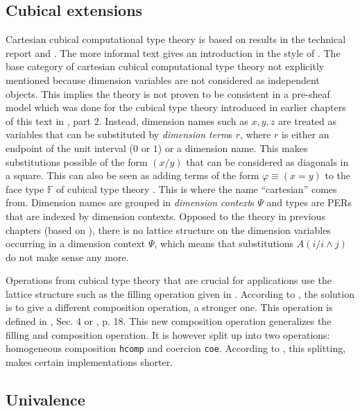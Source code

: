 \documentclass[12pt,a4paper,twoside,xetex]{book} %
\newcommand{\keyword}[1]{\emph{#1}\index{#1}}
\begin{document}
\subsection{Cubical extensions}

Cartesian cubical computational type theory is based on results in the technical 
report \cite{AnHoHa17} and \cite{Angiuli2018}. The more informal text 
\cite{Bentzen2018Jun} gives an introduction in the style of 
\cite{Voevodsky2013}. The base category of cartesian cubical computational type 
theory not explicitly mentioned because dimension variables are not considered 
as independent objects. This implies the theory is not proven to be consistent 
in a pre-sheaf model which was done for the cubical type theory introduced in 
earlier chapters of this text in \cite{Huber2016}, part 2. Instead, dimension 
names such as $x,y,z$ are treated as variables that can be substituted 
by \keyword{dimension term}s $r$, where $r$ is either an endpoint of the unit 
interval ($0$ or $1$) or a dimension name. This makes substitutions possible of 
the form $(x/y)$ that can be considered as diagonals in a square. This can also 
be seen as adding terms of the form $\varphi \equiv (x = y)$ to the face type 
$\mathbb{F}$ of cubical type theory \cite{Huber2016}. This is where the name 
``cartesian'' comes from. Dimension names are grouped in \keyword{dimension 
context}s $\Psi$ and types are PERs that are indexed by dimension contexts. 
Opposed to the theory in previous chapters (based on \cite{Huber2016}), there is 
no lattice structure on the dimension variables occurring in a dimension context 
$\Psi$, which means that substitutions  $A(i/i\wedge j)$ do not make sense 
any more.

Operations from cubical type theory that are crucial for applications use the 
lattice structure such as the filling operation given in . 
According to \cite{Moertberg2018Bonn}, the solution is to give a different 
composition operation, a stronger one. This operation is defined in 
\cite{Angiuli2018}, Sec. 4 or \cite{Moertberg2018Bonn}, p. 18. This new 
composition operation generalizes the filling and composition operation. It is 
however split up into two operations: homogeneous composition \texttt{hcomp} and 
coercion \texttt{coe}. According to \cite{Moertberg2018Bonn}, this splitting, 
makes certain implementations shorter.

\subsection{Univalence}\label{compuniv}
\end{document}
